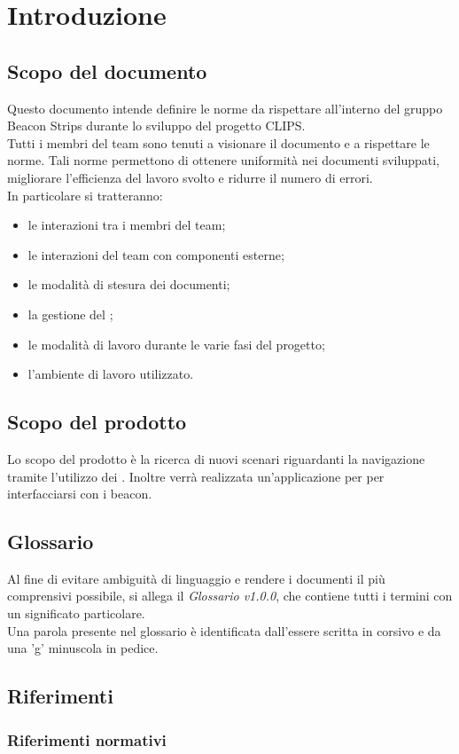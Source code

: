 \section{Introduzione}
	\subsection{Scopo del documento}
	Questo documento intende definire le norme da rispettare all'interno del gruppo Beacon Strips durante lo sviluppo del progetto CLIPS. \\
	Tutti i membri del team sono tenuti a visionare il documento e a rispettare le norme. Tali norme permettono di ottenere uniformità nei documenti sviluppati,
	migliorare l'efficienza del lavoro svolto e ridurre il numero di errori. \\
	In particolare si tratteranno:
	\begin{itemize}
		\item le interazioni tra i membri del team;
		\item le interazioni del team con componenti esterne;
		\item le modalità di stesura dei documenti;
		\item la gestione del ;
		\item le modalità di lavoro durante le varie fasi del progetto;
		\item l'ambiente di lavoro utilizzato.
	\end{itemize}
	
	\subsection{Scopo del prodotto}
	Lo scopo del prodotto è la ricerca di nuovi scenari riguardanti la navigazione tramite l'utilizzo dei . Inoltre verrà realizzata un'applicazione per  per interfacciarsi con i beacon.
	\subsection{Glossario}
	Al fine di evitare ambiguità di linguaggio e rendere i documenti il più comprensivi possibile, si allega il \textit {Glossario v1.0.0}, che contiene tutti i termini 
	con un significato particolare. \\
	Una parola presente nel glossario è identificata dall'essere scritta in corsivo e da una 'g'  minuscola in pedice. %
	\subsection{Riferimenti}
		\subsubsection{Riferimenti normativi}
		\NORMATIVI
	
